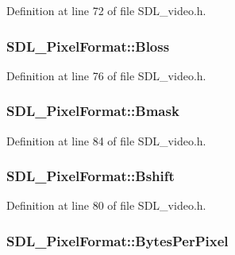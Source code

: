 Definition at line 72 of file S\+D\+L\+\_\+video.\+h.

\hypertarget{struct_s_d_l___pixel_format_a337072c1bc8b41efdd2da4e95b8c2ff7}{}
\subsubsection[{Bloss}]{ S\+D\+L\+\_\+\+Pixel\+Format\+::\+Bloss}\label{struct_s_d_l___pixel_format_a337072c1bc8b41efdd2da4e95b8c2ff7}


Definition at line 76 of file S\+D\+L\+\_\+video.\+h.

\hypertarget{struct_s_d_l___pixel_format_ad366812df3ae62edb9ae6cb89234fddb}{}
\subsubsection[{Bmask}]{ S\+D\+L\+\_\+\+Pixel\+Format\+::\+Bmask}\label{struct_s_d_l___pixel_format_ad366812df3ae62edb9ae6cb89234fddb}


Definition at line 84 of file S\+D\+L\+\_\+video.\+h.

\hypertarget{struct_s_d_l___pixel_format_a4212574b67529628d8822ed4eb109754}{}
\subsubsection[{Bshift}]{ S\+D\+L\+\_\+\+Pixel\+Format\+::\+Bshift}\label{struct_s_d_l___pixel_format_a4212574b67529628d8822ed4eb109754}


Definition at line 80 of file S\+D\+L\+\_\+video.\+h.

\hypertarget{struct_s_d_l___pixel_format_a6fec9e1809cc3da458d58b8cccd058f2}{}
\subsubsection[{Bytes\+Per\+Pixel}]{ S\+D\+L\+\_\+\+Pixel\+Format\+::\+Bytes\+Per\+Pixel}\label{struct_s_d_l___pixel_format_a6fec9e1809cc3da458d58b8cccd058f2}


